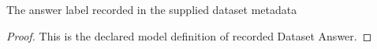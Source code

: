 \begin{definition}
  \label{def:physics:phyx-mini-0943:phyxminiproblems-problemphyxmini0943-recordeddatasetanswer}
  The answer label recorded in the supplied dataset metadata
\end{definition}
\begin{proof}
  This is the declared model definition of recorded Dataset Answer.
\end{proof}
